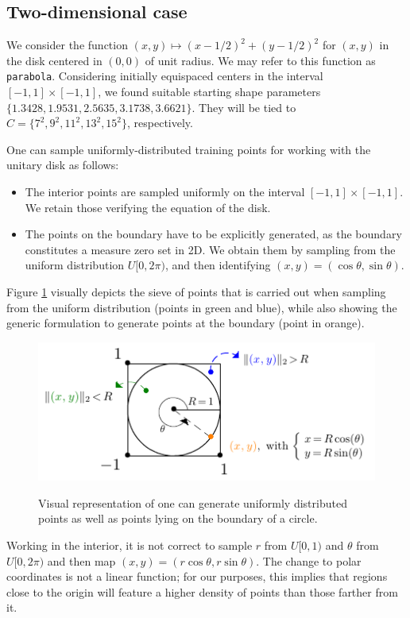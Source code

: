 \documentclass[12pt]{report} %
\begin{document}
\clearpage
\subsection*{Two-dimensional case}

We consider the function $(x,y) \mapsto (x-1/2)^2 + (y-1/2)^2$ for $(x,y)$ in the disk centered in $(0,0)$ of unit radius. We may refer to this function as \texttt{parabola}. Considering initially equispaced centers in the interval $[-1,1]\times[-1,1]$, we found suitable starting shape parameters $\{1.3428, 1.9531, 2.5635, 3.1738, 3.6621\}$. They will be tied to $C=\{7^2,9^2,11^2,13^2,15^2\}$, respectively.

One can sample uniformly-distributed training points for working with the unitary disk as follows:
\begin{itemize}
  \item The interior points are sampled uniformly on the interval $[-1,1]\times[-1,1]$. We retain those verifying the equation of the disk.
  \item The points on the boundary have to be explicitly generated, as the boundary constitutes a measure zero set in 2D. We obtain them by sampling from the uniform distribution $U[0,2\pi)$, and then identifying $(x,y)=(\cos\theta, \sin\theta)$.
\end{itemize}

Figure \ref{fig:uniform-circle} visually depicts the sieve of points that is carried out when sampling from the uniform distribution (points in green and blue), while also showing the generic formulation to generate points at the boundary (point in orange).

\begin{figure}[h]
  {\includegraphics[width=.8\textwidth]{imagenes/experiments/helpful_images/uniform_circle.pdf}}
  \caption{Visual representation of one can generate uniformly distributed points as well as points lying on the boundary of a circle.}
  \label{fig:uniform-circle}
\end{figure}

Working in the interior, it is not correct to sample $r$ from $U[0,1)$ and $\theta$ from $U[0,2\pi)$ and then map $(x,y)=(r \cos \theta, r \sin \theta)$. The change to polar coordinates is not a linear function; for our purposes, this implies that regions close to the origin will feature a higher density of points than those farther from it.
\end{document}
